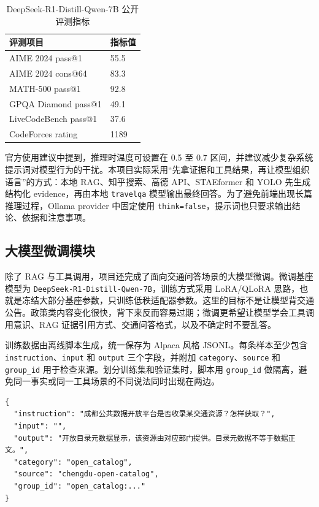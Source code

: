 \documentclass[bwprint]{report}
\begin{document}
\begin{table}[H]
    \caption{DeepSeek-R1-Distill-Qwen-7B 公开评测指标}
    \label{tab:deepseek-benchmark}
    \centering
    \begin{tabular}{p{}p{}}
        \toprule[1.5pt]
        评测项目 & 指标值 \\
        \midrule[1pt]
        AIME 2024 pass@1 & 55.5 \\
        AIME 2024 cons@64 & 83.3 \\
        MATH-500 pass@1 & 92.8 \\
        GPQA Diamond pass@1 & 49.1 \\
        LiveCodeBench pass@1 & 37.6 \\
        CodeForces rating & 1189 \\
        \bottomrule[1.5pt]
    \end{tabular}
\end{table}

官方使用建议中提到，推理时温度可设置在 0.5 至 0.7 区间，并建议减少复杂系统提示词对模型行为的干扰。本项目实际采用``先拿证据和工具结果，再让模型组织语言''的方式：本地 RAG、知乎搜索、高德 API、STAEformer 和 YOLO 先生成结构化 evidence，再由本地 \texttt{travelqa} 模型输出最终回答。为了避免前端出现长篇推理过程，Ollama provider 中固定使用 \texttt{think=false}，提示词也只要求输出结论、依据和注意事项。

\subsection{大模型微调模块}
除了 RAG 与工具调用，项目还完成了面向交通问答场景的大模型微调。微调基座模型为 \texttt{DeepSeek-R1-Distill-Qwen-7B}，训练方式采用 LoRA/QLoRA 思路，也就是冻结大部分基座参数，只训练低秩适配器参数。这里的目标不是让模型背交通公告。政策类内容变化很快，背下来反而容易过期；微调更希望让模型学会工具调用意识、RAG 证据引用方式、交通问答格式，以及不确定时不要乱答。

训练数据由离线脚本生成，统一保存为 Alpaca 风格 JSONL。每条样本至少包含 \texttt{instruction}、\texttt{input} 和 \texttt{output} 三个字段，并附加 \texttt{category}、\texttt{source} 和 \texttt{group\_id} 用于检查来源。划分训练集和验证集时，脚本用 \texttt{group\_id} 做隔离，避免同一事实或同一工具场景的不同说法同时出现在两边。

\begin{lstlisting}
{
  "instruction": "成都公共数据开放平台是否收录某交通资源？怎样获取？",
  "input": "",
  "output": "开放目录元数据显示，该资源由对应部门提供。目录元数据不等于数据正文。",
  "category": "open_catalog",
  "source": "chengdu-open-catalog",
  "group_id": "open_catalog:..."
}
\end{lstlisting}
\end{document}
